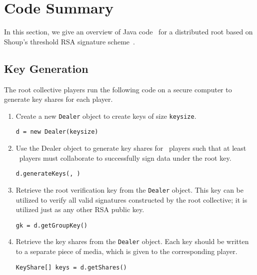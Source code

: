 \section{Code Summary}
\label{sec:code}

In this section, we give an overview of Java code~\cite{sig-code} for
a distributed root based on Shoup's threshold RSA signature
scheme~\cite{shoup-sig}.

\subsection{Key Generation}

The root collective players run the following code on a secure
computer to generate key shares for each player.
\begin{enumerate}
\item Create a new {\tt Dealer} object to create keys of size {\tt keysize}.

        {\tt d = new Dealer(keysize)}

\item	Use the Dealer object to generate key shares for \nump\
	players such that at least \nums\ players must collaborate to
	successfully sign data under the root key.

 	{\tt d.generateKeys(\nums, \nump)} 

\item	Retrieve the root verification key from the {\tt Dealer}
	object. This key can be utilized to verify all valid
	signatures constructed by the root collective; it is utilized
	just as any other RSA public key.

	{\tt gk = d.getGroupKey()} 

\item	Retrieve the key shares from the {\tt Dealer} object. Each key
	should be written to a separate piece of media, which is given
	to the corresponding player.

	{\tt KeyShare[] keys = d.getShares()}
\end{enumerate}


